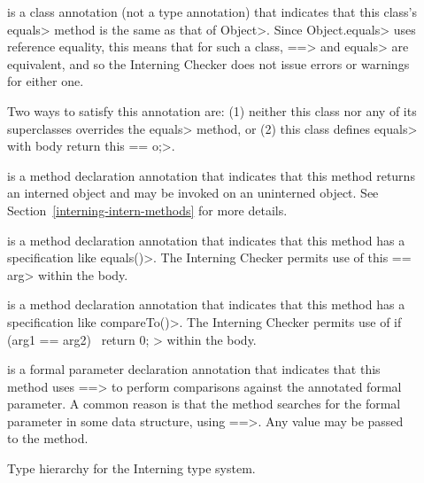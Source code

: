 \begin{description}

\item[]
  is a class annotation (not a type annotation) that indicates that this class's
  \<equals> method is the same as that of \<Object>.  Since
  \<Object.equals> uses reference equality, this means that for such a
  class, \<==> and \<equals> are equivalent, and so the Interning Checker
  does not issue errors or warnings for either one.

  Two ways to satisfy this annotation are:  (1) neither this class nor any
  of its superclasses overrides the \<equals> method, or (2) this class
  defines \<equals> with body \<return this == o;>.

\item[]
  is a method declaration annotation that indicates that this method
  returns an interned object and may be invoked
  on an uninterned object. See Section~\ref{interning-intern-methods} for more details.

\item[]
  is a method declaration annotation that indicates that this method
  has a specification like \<equals()>.  The Interning Checker permits use
  of \<this == arg> within the body.

\item[]
  is a method declaration annotation that indicates that this method
  has a specification like \<compareTo()>.  The Interning Checker permits use
  of \<if (arg1 == arg2) \ttlcb\ return 0; \ttrcb> within the body.

\item[]
  is a formal parameter declaration annotation that indicates that this
  method uses \<==> to perform comparisons against the annotated formal
  parameter.  A common reason is that the method searches for the formal
  parameter in some data structure, using \<==>.  Any value
  may be passed to the method.
\end{description}


\begin{figure}
\caption{Type hierarchy for the Interning type system.}
\label{fig-interning-hierarchy}
\end{figure}

